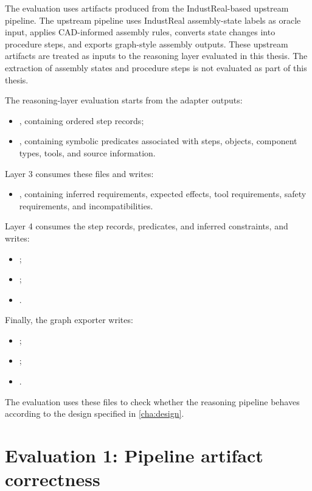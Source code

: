 The evaluation uses artifacts produced from the IndustReal-based upstream pipeline. The upstream pipeline uses IndustReal assembly-state labels as oracle input, applies CAD-informed assembly rules, converts state changes into procedure steps, and exports graph-style assembly outputs. These upstream artifacts are treated as inputs to the reasoning layer evaluated in this thesis. The extraction of assembly states and procedure steps is not evaluated as part of this thesis.

The reasoning-layer evaluation starts from the adapter outputs:
\begin{itemize}
    \item {}, containing ordered step records;
    \item {}, containing symbolic predicates associated with steps, objects, component types, tools, and source information.
\end{itemize}

Layer 3 consumes these files and writes:
\begin{itemize}
    \item {}, containing inferred requirements, expected effects, tool requirements, safety requirements, and incompatibilities.
\end{itemize}

Layer 4 consumes the step records, predicates, and inferred constraints, and writes:
\begin{itemize}
    \item {};
    \item {};
    \item {}.
\end{itemize}

Finally, the graph exporter writes:
\begin{itemize}
    \item {};
    \item {};
    \item {}.
\end{itemize}

The evaluation uses these files to check whether the reasoning pipeline behaves according to the design specified in \cref{cha:design}.

\section{Evaluation 1: Pipeline artifact correctness}
\label{sec:evaluation-artifact-correctness}


